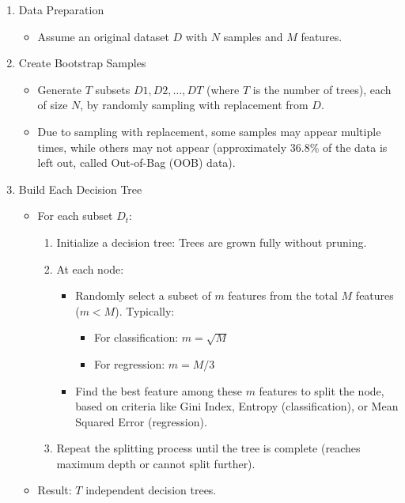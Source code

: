 \begin{enumerate}[label=Step \arabic*:, align=left, leftmargin=20pt,labelsep=1em]
    \item Data Preparation
    \begin{itemize}
        \item Assume an original dataset $D$ with $N$ samples and $M$ features.
    \end{itemize}

    \item Create Bootstrap Samples
    \begin{itemize}
        \item Generate $T$ subsets $D1, D2, \ldots,DT$ (where $T$ is the number of trees), each of size $N$, by randomly sampling with replacement from $D$.
        \item Due to sampling with replacement, some samples may appear multiple times, while others may not appear (approximately 36.8\% of the data is left out, called Out-of-Bag (OOB) data).
    \end{itemize}

    \item Build Each Decision Tree
    \begin{itemize}
        \item For each subset $D_t$:
        \begin{enumerate}
            \item Initialize a decision tree: Trees are grown fully without pruning.
            \item At each node:
            \begin{itemize}
                \item Randomly select a subset of $m$ features from the total $M$ features ($m < M$). Typically:
                \begin{itemize}
                    \item For classification: $m = \sqrt{M}$
                    \item For regression: $m = M/3$
                \end{itemize}
                \item Find the best feature among these $m$ features to split the node, based on criteria like Gini Index, Entropy (classification), or Mean Squared Error (regression).
            \end{itemize}
            \item Repeat the splitting process until the tree is complete (reaches maximum depth or cannot split further).
        \end{enumerate}
        \item Result: $T$ independent decision trees.
    \end{itemize}


\end{enumerate}
